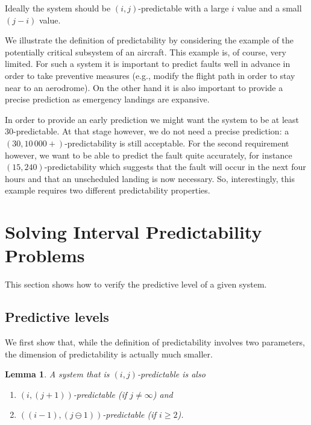 \documentclass{article}
\newtheorem{lemm}{Lemma}
\begin{document}
Ideally the system should be $(i,j)$-predictable with a large $i$ value 
and a small $(j-i)$ value.  

We illustrate the definition of predictability by considering the example 
of the potentially critical subsystem of an aircraft.  
This example is, of course, very limited.  
For such a system it is important to predict faults well in advance 
in order to take preventive measures 
(e.g., modify the flight path in order to stay near to an aerodrome).  
On the other hand it is also important to provide a precise prediction 
as emergency landings are expansive.  

In order to provide an early prediction 
we might want the system to be at least $30$-predictable.  
At that stage however, we do not need a precise prediction: 
a $(30,10\,000+)$-predictability is still acceptable.  
For the second requirement however, 
we want to be able to predict the fault quite accurately, 
for instance $(15,240)$-predictability
which suggests that the fault will occur in the next four hours 
and that an unscheduled landing is now necessary.  
So, interestingly, this example requires 
two different predictability properties.  

\section{Solving Interval Predictability Problems}
\label{sec::solution}
This section shows how to verify the predictive level 
of a given system.  

\subsection{Predictive levels}

We first show that, 
while the definition of predictability involves two parameters, 
the dimension of predictability is actually much smaller.  

\begin{lemm}\label{lemm::pred->pred}
  A system that is $(i,j)$-predictable 
  is also 
  \begin{enumerate}
  \item 
    $(i,(j+1))$-predictable (if $j \neq \infty$) 
    and
  \item 
    $((i-1),(j\ominus 1))$-predictable (if $i \ge 2$). 
  \end{enumerate}
\end{lemm}
\end{document}
